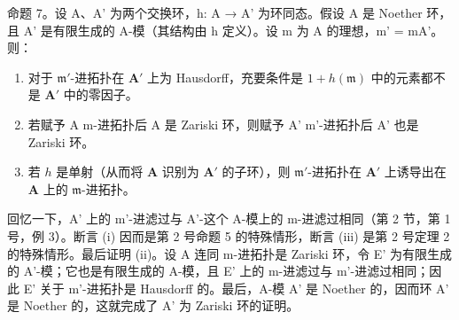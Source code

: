 命题 7。设 A、A' 为两个交换环，h: A → A' 为环同态。假设 A 是 Noether 环，且 A' 是有限生成的 A-模（其结构由 h 定义）。设 m 为 A 的理想，m' = mA'。则：

\begin{enumerate}
\def\labelenumi{(\roman{enumi})}
\item
  对于 \(\mathfrak{m}'\)-进拓扑在 \(\mathbf{A}'\) 上为 Hausdorff，充要条件是 \(1 + h(\mathfrak{m})\) 中的元素都不是 \(\mathbf{A}'\) 中的零因子。
\item
  若赋予 A m-进拓扑后 A 是 Zariski 环，则赋予 A' m'-进拓扑后 A' 也是 Zariski 环。
\item
  若 \(h\) 是单射（从而将 \(\mathbf{A}\) 识别为 \(\mathbf{A}'\) 的子环），则 \(\mathfrak{m}'\)-进拓扑在 \(\mathbf{A}'\) 上诱导出在 \(\mathbf{A}\) 上的 \(\mathfrak{m}\)-进拓扑。
\end{enumerate}

回忆一下，A' 上的 m'-进滤过与 A'-这个 A-模上的 m-进滤过相同（第 2 节，第 1 号，例 3）。断言 (i) 因而是第 2 号命题 5 的特殊情形，断言 (iii) 是第 2 号定理 2 的特殊情形。最后证明 (ii)。设 A 连同 m-进拓扑是 Zariski 环，令 E' 为有限生成的 A'-模；它也是有限生成的 A-模，且 E' 上的 m-进滤过与 m'-进滤过相同；因此 E' 关于 m'-进拓扑是 Hausdorff 的。最后，A-模 A' 是 Noether 的，因而环 A' 是 Noether 的，这就完成了 A' 为 Zariski 环的证明。

